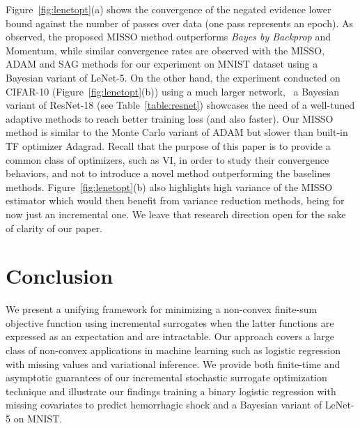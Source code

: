 \documentclass[11pt]{article}
\theoremstyle{t}
\begin{document}
Figure~\ref{fig:lenetopt}(a) shows the convergence of the negated evidence lower bound against the number of passes over data (one pass represents an epoch). As observed, the proposed MISSO method outperforms \textit{Bayes by Backprop} and Momentum, while similar convergence rates are observed with the MISSO, ADAM and SAG methods for our experiment on MNIST dataset using a Bayesian variant of LeNet-5. 
On the other hand, the experiment conducted on CIFAR-10 (Figure~\ref{fig:lenetopt}(b)) using a much larger network, \ie\ a Bayesian variant of ResNet-18 (see Table~\ref{table:resnet}) showcases the need of a well-tuned adaptive methods to reach better training loss (and also faster). Our MISSO method is similar to the Monte Carlo variant of ADAM but slower than built-in TF optimizer Adagrad. Recall that the purpose of this paper is to provide a common class of optimizers, such as VI, in order to study their convergence behaviors, and not to introduce a novel method outperforming the baselines methods.
Figure~\ref{fig:lenetopt}(b) also highlights high variance of the MISSO estimator which would then benefit from variance reduction methods, being for now just an incremental one. We leave that research direction open for the sake of clarity of our paper.


\section{Conclusion}
We present a unifying framework for minimizing a non-convex finite-sum objective function using incremental surrogates when the latter functions are expressed as an expectation and are intractable.
Our approach covers a large class of non-convex applications in machine learning such as logistic regression with missing values and variational inference.
We provide both finite-time and asymptotic guarantees of our incremental stochastic surrogate optimization technique and illustrate our findings training a binary logistic regression with missing covariates to predict hemorrhagic shock and a Bayesian variant of LeNet-5 on MNIST.

\newpage




\newpage

\appendix
\end{document}
